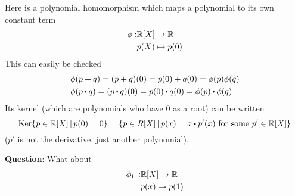 \documentclass[../Main.tex]{subfiles}
\begin{document}
\begin{example}
	Here is a polynomial homomorphism which maps a polynomial to its own constant term
	\begin{align*}
		\phi: &\mathbb{R}[X] \to \mathbb{R} \\
		&p(X) \mapsto p(0)
	\end{align*}
	This can easily be checked
	\begin{align*}
		&\phi(p+q) = (p+q)(0)=p(0)+q(0)=\phi(p)\phi(q)\\
		&\phi(p\rdot q)=(p\rdot q)(0)=p(0)\rdot q(0)=\phi(p)\rdot \phi(q)
	\end{align*}
	Its kernel (which are polynomials who have $0$ as a root) can be written
	\[\Ker \{p\in \R[X]\,|\,p(0)=0\} = \{p\in R[X]\,|\,p(x) = x\rdot p'(x) \text{ for some } p'\in \R[X]\}\]
	($p'$ is not the derivative, just another polynomial).
\end{example}
\textbf{Question}: What about
\begin{align*}
	\phi_1 \,: &\mathbb{R}[X] \to \mathbb{R}\\
	&p(x) \mapsto p(1)
\end{align*}
\end{document}
